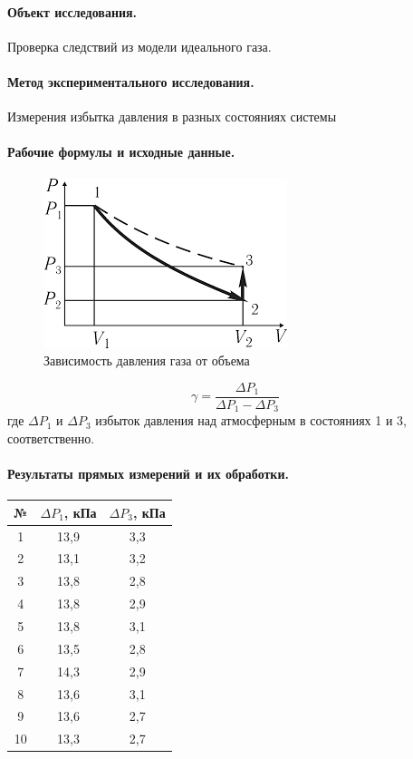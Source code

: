 \documentclass{article}
\begin{document}
\paragraph{Объект исследования.} Проверка следствий из модели идеального газа.
\paragraph{Метод экспериментального исследования.} Измерения избытка давления в разных состояниях системы

\paragraph{Рабочие формулы и исходные данные.}\hypertarget{formuls}{}
\begin{figure}[htb]
	\centering\includegraphics[scale=0.5]{plot}
	\caption{Зависимость давления газа от объема}
\end{figure}
\begin{equation}
	\gamma=\frac{\Delta P_1}{\Delta P_1 - \Delta P_3}
\end{equation}
где $\Delta P_1$ и $\Delta P_3$ избыток давления над атмосферным в состояниях 1 и 3, соответственно.

\paragraph{Результаты прямых измерений и их обработки.}

\begin{center}
\begin{tabular}{c|c|c}
	№& $\Delta P_1$, кПа & $\Delta P_3$, кПа \\
	\hline
	1& 13,9&3,3  \\
	2& 13,1&3,2  \\
	3&13,8 &2,8  \\
	4&13,8&2,9  \\
	5& 13,8&3,1  \\
	6& 13,5&2,8  \\
	7&14,3 &2,9  \\
	8& 13,6&3,1  \\
	9& 13,6&2,7  \\
	10& 13,3&2,7  \\
\end{tabular}
\end{center}
\end{document}
